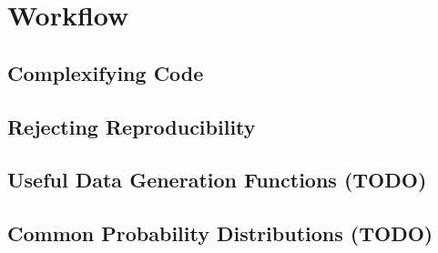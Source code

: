 \documentclass[
]{krantz}
\begin{document}
\hypertarget{part-workflow}{%
\part*{Workflow}\label{part-workflow}}


\hypertarget{comp-code}{%
\chapter{Complexifying Code}\label{comp-code}}

\hypertarget{reje-repr}{%
\chapter{Rejecting Reproducibility}\label{reje-repr}}

\cleardoublepage

\hypertarget{appendix-appendix}{%
\appendix {}}


\hypertarget{useful-data-generation-functions-todo}{%
\chapter{Useful Data Generation Functions (TODO)}\label{useful-data-generation-functions-todo}}

\hypertarget{common-probability-distributions-todo}{%
\chapter{Common Probability Distributions (TODO)}\label{common-probability-distributions-todo}}

  

\backmatter
\printindex
\end{document}
